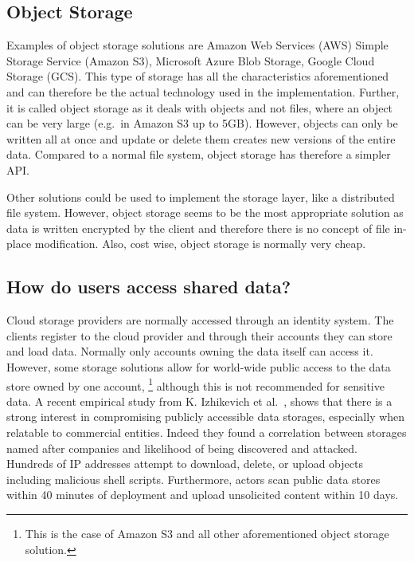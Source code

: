\subsection{Object Storage}  
Examples of object storage solutions are Amazon Web Services (AWS)
Simple Storage Service (Amazon S3), Microsoft Azure Blob Storage, Google Cloud Storage (GCS).
This type of storage has all the characteristics aforementioned and can 
therefore be the actual technology used in the implementation. 
Further, it is called object storage as it deals with objects and not files, 
where an object can be very large (e.g.\ in Amazon S3 up to 5GB).
However, objects can only be written all at once
and update or delete them creates new versions of the entire data.
Compared to a normal file system, object storage has therefore a simpler API.

Other solutions could be used to implement the storage layer,
like a distributed file system.
However, object storage seems to be the most appropriate
solution as data is written encrypted by the client and therefore
there is no concept of file in-place modification.
Also, cost wise, object storage is normally very cheap.

\subsection{How do users access shared data?}
Cloud storage providers are normally accessed through an
identity system. The clients register to the cloud provider and
through their accounts they can store and load data.
Normally only accounts owning the data itself can access it.
However, some storage solutions allow for world-wide public access 
to the data store owned by one account,
\footnote{This is the case of Amazon S3 and all other aforementioned object storage solution.} 
although this is not recommended for sensitive data.
A recent empirical study from K. Izhikevich et al.~\cite{izhikevich2023using},
shows that there is a strong interest
in compromising publicly accessible data storages,
especially when relatable to commercial entities.
Indeed they found a correlation between storages named after companies and likelihood of being discovered and attacked.
Hundreds of IP addresses attempt to download, delete, or upload objects including malicious shell scripts. 
Furthermore, actors scan public data stores within 40 minutes of deployment and upload unsolicited content within 10 days.

